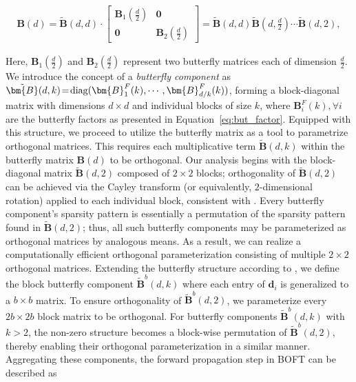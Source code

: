 \begin{equation}
\begin{aligned}
    \!\!\bm{B}(d)=\tilde{\bm{B}}(d,d)\!\cdot\!\begin{bmatrix}
    \bm{B}_1(\frac{d}{2})\!\!\!\!\! & \bm{0} \\
    \bm{0}\!\!\!\!\! &\bm{B}_2(\frac{d}{2})
    \end{bmatrix}= \tilde{\bm{B}}(d,d)\tilde{\bm{B}}(d,\frac{d}{2})\cdots\tilde{\bm{B}}(d,2),
\end{aligned}
\end{equation}

Here, $\bm{B}_1(\frac{d}{2})$ and $\bm{B}_2(\frac{d}{2})$ represent two butterfly matrices each of dimension $\frac{d}{2}$. We introduce the concept of a \emph{butterfly component} as $\thickmuskip=2mu \medmuskip=2mu \tilde{\bm{B}}(d,k)=\text{diag}(\bm{B}^F_1(k),\cdots,\bm{B}^F_{d/k}(k))$, forming a block-diagonal matrix with dimensions $d\times d$ and individual blocks of size $k$, where $\bm{B}^F_i(k),\forall i$ are the butterfly factors as presented in Equation~\ref{eq:but_factor}. Equipped with this structure, we proceed to utilize the butterfly matrix as a tool to parametrize orthogonal matrices. This requires each multiplicative term $\tilde{\bm{B}}(d,k)$ within the butterfly matrix $\bm{B}(d)$ to be orthogonal. Our analysis begins with the block-diagonal matrix $\tilde{\bm{B}}(d,2)$ composed of $2\times 2$ blocks; orthogonality of $\tilde{\bm{B}}(d,2)$ can be achieved via the Cayley transform (or equivalently, $2$-dimensional rotation) applied to each individual block, consistent with \cite{liu2021orthogonal,qiu2023controlling}. Every butterfly component’s sparsity pattern is essentially a permutation of the sparsity pattern found in $\tilde{\bm{B}}(d,2)$; thus, all such butterfly components may be parameterized as orthogonal matrices by analogous means. As a result, we can realize a computationally efficient orthogonal parameterization consisting of multiple $2\times 2$ orthogonal matrices. Extending the butterfly structure according to \cite{chen2022pixelated}, we define the block butterfly component $\tilde{\bm{B}}^b(d,k)$ where each entry of $\bm{d}_i$ is generalized to a $b\times b$ matrix. To ensure orthogonality of $\tilde{\bm{B}}^b(d,2)$, we parameterize every $2b\times 2b$ block matrix to be orthogonal. For butterfly components $\tilde{\bm{B}}^b(d,k)$ with $k>2$, the non-zero structure becomes a block-wise permutation of $\tilde{\bm{B}}^b(d,2)$, thereby enabling their orthogonal parameterization in a similar manner. Aggregating these components, the forward propagation step in BOFT can be described as

